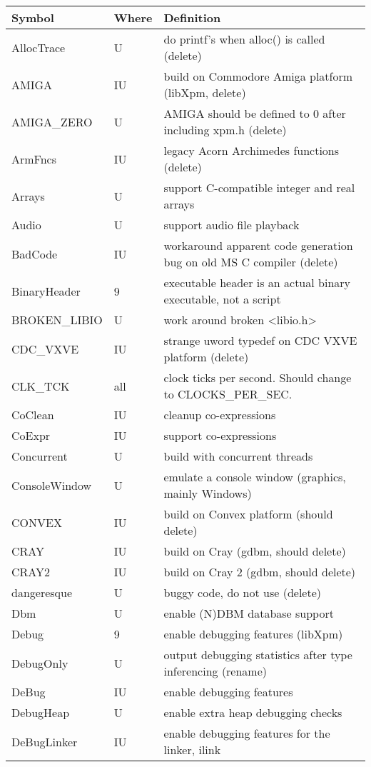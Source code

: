 \begin{xtabular}{|m{1.8in}|m{0.5in}|m{4.0in}|}
\hline
Symbol & Where & Definition \\ \hline
AllocTrace & U & do printf's when alloc() is called (delete) \\
AMIGA & IU & build on Commodore Amiga platform (libXpm, delete) \\ 
AMIGA\_ZERO & U & AMIGA should be defined to 0 after including xpm.h (delete) \\ 
ArmFncs & IU & legacy Acorn Archimedes functions (delete) \\
Arrays & U & support C-compatible integer and real arrays \\
Audio & U & support audio file playback \\
BadCode & IU & workaround apparent code generation bug on old MS C compiler (delete) \\
BinaryHeader & 9 & executable header is an actual binary executable,
		not a script \\
BROKEN\_LIBIO & U & work around broken <libio.h> \\
CDC\_VXVE & IU & strange uword typedef on CDC VXVE platform (delete) \\
CLK\_TCK & all & clock ticks per second. Should change to CLOCKS\_PER\_SEC. \\
CoClean & IU & cleanup co-expressions \\
CoExpr & IU & support co-expressions \\
Concurrent & U & build with concurrent threads \\
ConsoleWindow & U & emulate a console window (graphics, mainly Windows) \\
CONVEX & IU & build on Convex platform (should delete) \\
CRAY & IU & build on Cray (gdbm, should delete) \\
CRAY2 & IU & build on Cray 2 (gdbm, should delete) \\
dangeresque & U & buggy code, do not use (delete) \\
Dbm & U & enable (N)DBM database support \\
Debug & 9 & enable debugging features (libXpm) \\
DebugOnly & U & output debugging statistics after type inferencing (rename) \\
DeBug & IU & enable debugging features \\
DebugHeap & U & enable extra heap debugging checks \\
DeBugLinker & IU & enable debugging features for the linker, ilink \\

\end{xtabular}
